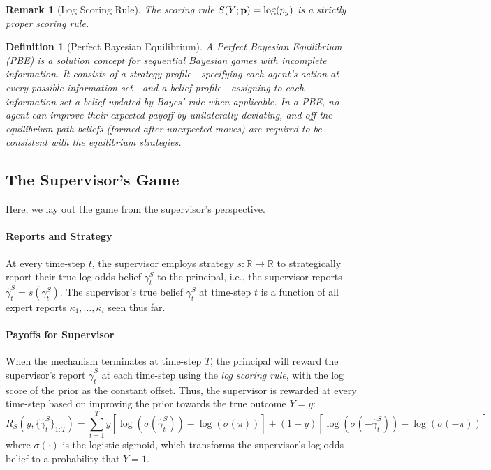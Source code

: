 \documentclass{winnower}
\newtheorem{definition}{Definition}
\newtheorem{remark}{Remark}
\begin{document}
\begin{remark}[Log Scoring Rule]
    The scoring rule $S(Y; {\bf p}) = \log(p_y)$ is a strictly proper scoring rule.
\end{remark}


\begin{definition}[Perfect Bayesian Equilibrium]
    A Perfect Bayesian Equilibrium (PBE) is a solution concept for sequential Bayesian games with incomplete information. It consists of a strategy profile—specifying each agent’s action at every possible information set—and a belief profile—assigning to each information set a belief updated by Bayes’ rule when applicable. In a PBE, no agent can improve their expected payoff by unilaterally deviating, and off-the-equilibrium-path beliefs (formed after unexpected moves) are required to be consistent with the equilibrium strategies. 
\end{definition}

\subsection{The Supervisor's Game}

Here, we lay out the game from the supervisor's perspective.

\paragraph{Reports and Strategy} At every time-step $t$, the supervisor employs strategy $s: \mathbb{R} \rightarrow \mathbb{R}$ to strategically report their true log odds belief $\gamma_t^S$ to the principal, i.e., the supervisor reports $\hat{\gamma}_t^S = s(\gamma_t^S)$. The supervisor's true belief $\gamma_t^S$ at time-step $t$ is a function of all expert reports $\kappa_1, \ldots, \kappa_t$ seen thus far.

\paragraph{Payoffs for Supervisor} When the mechanism terminates at time-step $T$, the principal will reward the supervisor's report $\hat{\gamma}_t^S$ at each time-step using the \emph{log scoring rule}, with the log score of the prior as the constant offset. Thus, the  supervisor is rewarded at every time-step based on improving the prior towards the true outcome $Y=y$:
{\small
\begin{equation}\label{eq:suprew}
    R_S\left(y, \{ \hat{\gamma}_{t}^{S} \}_{1:T} \right) = \sum_{t=1}^T  y\left[\log\left( \sigma(\hat{\gamma}_{t}^{S}) \right) - \log(\sigma(\pi))\right] + (1-y)\left[\log\left( \sigma(-\hat{\gamma}_{t}^{S}) \right) - \log(\sigma(-\pi))\right]
\end{equation}
}
where $\sigma(\cdot)$ is the logistic sigmoid, which transforms the supervisor's log odds belief to a probability that $Y=1$.
\end{document}

